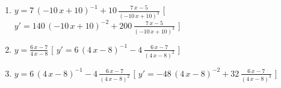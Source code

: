 \begin{esercizio}
\begin{enumerate}
\item $y= 7\, \left( -10\,x+10 \right) ^{-1}+10\,{\frac {7\,x-5}{ \left( -10\,x+10 \right) ^{2}}} $ \hfill [ $y'= 140\, \left( -10\,x+10 \right) ^{-2}+200\,{\frac {7\,x-5}{ \left( -10\,x+10 \right) ^{3}}}$ ]
\item $y= {\frac {6\,x-7}{4\,x-8}} $ \hfill [ $y'= 6\, \left( 4\,x-8 \right) ^{-1}-4\,{\frac {6\,x-7}{ \left( 4\,x-8 \right) ^{2}}}$ ]
\item $y= 6\, \left( 4\,x-8 \right) ^{-1}-4\,{\frac {6\,x-7}{ \left( 4\,x-8 \right) ^{2}}} $ \hfill [ $y'= -48\, \left( 4\,x-8 \right) ^{-2}+32\,{\frac {6\,x-7}{ \left( 4\,x-8 \right) ^{3}}}$ ]
 \end{enumerate}
\end{esercizio}